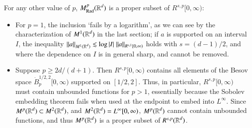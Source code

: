 For any other value of $p$, $M^p_{\text{Rad}}(\operatorname{\mathbb{R}}^d)$ is a proper subset of $R^{s,p}[0,\infty)$:
%
\begin{itemize}
  \item For $p = 1$, the inclusion `fails by a logarithm', as we can see by the characterization of $M^1(\operatorname{\mathbb{R}}^d)$ in the last section; if $a$ is supported on an interval $I$, the inequality $\| a \|_{M^1(\operatorname{\mathbb{R}}^d)} \lesssim \log |I|\; \| a \|_{R^{s,1}[0,\infty)}$ holds with $s = (d-1)/2$, and where the dependence on $I$ is in general sharp, and cannot be removed.

  \item Suppose $p \geq 2d/(d+1)$. Then $R^{s,p}[0,\infty)$ contains all elements of the Besov space $\dot{B}^{{1/2},2}_p[0,\infty)$ supported on $[1/2,2]$. Thus, in particular, $R^{s,p}[0,\infty)$ must contain unbounded functions for $p > 1$, essentially because the Sobolev embedding theorem fails when used at the endpoint to embed into $L^\infty$. Since $M^p(\operatorname{\mathbb{R}}^d) \subset M^2(\operatorname{\mathbb{R}}^d)$, and $M^2(\operatorname{\mathbb{R}}^d) = L^\infty[0,\infty)$, $M^p(\operatorname{\mathbb{R}}^d)$ cannot contain unbounded functions, and thus $M^p(\operatorname{\mathbb{R}}^d)$ is a proper subset of $R^{s,p}(\operatorname{\mathbb{R}}^d)$.







\end{itemize}
